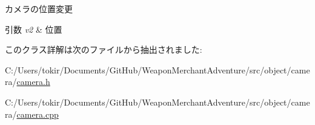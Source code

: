 カメラの位置変更 


\begin{DoxyParams}{引数}
{\em v2} & 位置 \\
\hline
\end{DoxyParams}


このクラス詳解は次のファイルから抽出されました\+:\begin{DoxyCompactItemize}
\item 
C\+:/\+Users/tokir/\+Documents/\+Git\+Hub/\+Weapon\+Merchant\+Adventure/src/object/camera/\mbox{\hyperlink{camera_8h}{camera.\+h}}\item 
C\+:/\+Users/tokir/\+Documents/\+Git\+Hub/\+Weapon\+Merchant\+Adventure/src/object/camera/\mbox{\hyperlink{camera_8cpp}{camera.\+cpp}}\end{DoxyCompactItemize}
